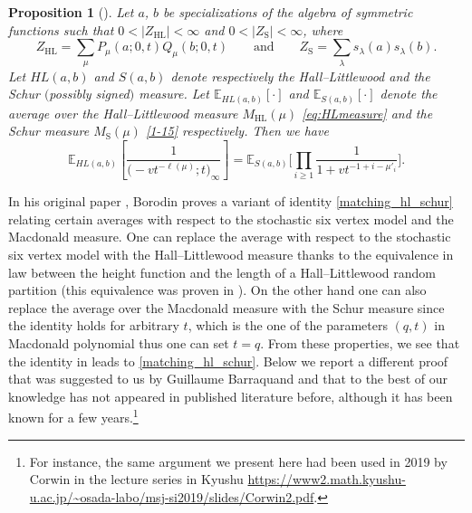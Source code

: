\documentclass[pdftex]{sigma}
\numberwithin{equation}{section}
\newtheorem{Proposition}[Theorem]{Proposition}
 { \theoremstyle{definition}
\newtheorem{Definition}[Theorem]{Definition}
\newtheorem{Note}[Theorem]{Note}
\newtheorem{Example}[Theorem]{Example}
\newtheorem{Remark}[Theorem]{Remark} }
\begin{document}
\begin{Proposition}[\cite{Borodin2018momentmatch}]
Let $a$, $b$ be specializations of the algebra of symmetric functions such that $0<|Z_{\mathrm{HL}}|<\infty$ and $0<|Z_{\mathrm{S}}|<\infty$, where \[Z_{\mathrm{HL}}=\sum_{\mu}P_{\mu}(a;0,t)Q_{\mu}(b;0,t)\qquad \text{and}\qquad Z_{\mathrm{S}}\!=\!\sum_{\lambda}s_{\lambda}(a)s_{\lambda}(b).
\]
 Let $HL(a,b)$ and $S(a,b)$ denote respectively the Hall--Littlewood and the Schur $($possibly signed$)$ measure.
Let $\mathbb{E}_{HL(a,b)}[\cdot]$ and $\mathbb{E}_{S(a,b)}[\cdot]$ denote
the average over the Hall--Littlewood measure $M_{\text{HL}}(\mu)$ \eqref{eq:HLmeasure} and the Schur measure $M_{\text{S}}(\mu)$ \eqref{1-15} respectively.
Then we have
	 \begin{equation} \label{matching_hl_schur}
 	\mathbb{E}_{HL(a,b)}\left[ \frac{1}{\bigl(-vt^{-\ell(\mu)};t\bigr)_\infty} \right] = \mathbb{E}_{S(a,b)}\Bigg[ \prod_{i\ge 1} \frac{1}{1+v t^{-1+i-\mu'_i}} \Bigg].
 \end{equation}
\end{Proposition}

In his original paper \cite[Corollary 4.4]{Borodin2018momentmatch}, Borodin proves a variant of identity \eqref{matching_hl_schur} relating certain averages with respect to the stochastic six vertex model and the Macdonald measure. One can replace the average with respect to the stochastic six vertex model with the Hall--Littlewood measure thanks to the equivalence in law between the height function and the length of a Hall--Littlewood random partition (this equivalence was proven in \cite{BorodinBufetovWheeler2016}). On the other hand one can also replace the average over the Macdonald measure with the Schur measure since the identity holds for arbitrary $t$, which is the one of the parameters $(q,t)$ in Macdonald polynomial thus one can set $t=q$. From these properties, we see that the identity in \cite[Corollary 4.4]{Borodin2018momentmatch} leads to \eqref{matching_hl_schur}. Below we report a different proof that was suggested to us by Guillaume Barraquand and that to the best of our knowledge has not appeared in published literature before, although it has been known for a few years.\footnote{For instance, the same argument we present here had been used in 2019 by Corwin in the lecture series in Kyushu \url{https://www2.math.kyushu-u.ac.jp/~osada-labo/msj-si2019/slides/Corwin2.pdf}.}
\end{document}
